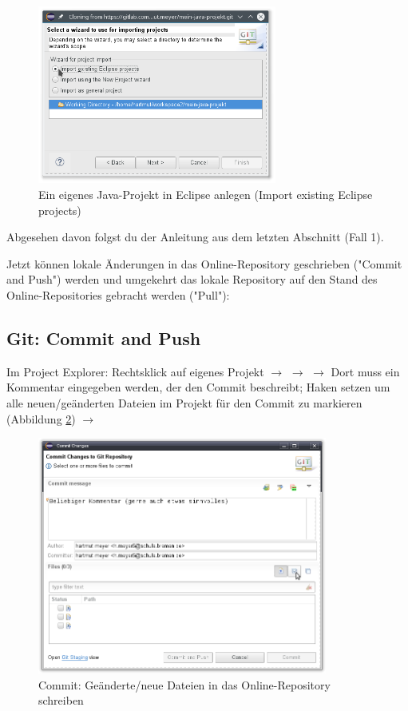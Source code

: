 \begin{figure}[h]
  \centering
   \includegraphics[width=0.70\textwidth]{./inf/SEKII/01_Vorbereitung/Import_Project_from_Git_Import_Existing_Eclipse_Project.png}
   \caption{Ein eigenes Java-Projekt in Eclipse anlegen (Import existing Eclipse projects)}
   \label{fig:import-project-from-git-import-existing-project}
\end{figure}

Abgesehen davon folgst du der Anleitung aus dem letzten Abschnitt (Fall 1).

Jetzt können lokale Änderungen in das Online-Repository geschrieben ("Commit
and Push") werden und umgekehrt das lokale Repository auf den Stand des
Online-Repositories gebracht werden ("Pull"):

\subsection{Git: Commit and Push}

Im Project Explorer: Rechtsklick auf eigenes Projekt $\rightarrow$ 
$\rightarrow$  $\rightarrow$ Dort muss ein Kommentar
eingegeben werden, der den Commit beschreibt; Haken setzen um alle
neuen/geänderten Dateien im Projekt für den Commit zu markieren (Abbildung
\ref{fig:git-commit}) $\rightarrow$ 

\begin{figure}[h]
  \centering
   \includegraphics[width=0.85\textwidth]{./inf/SEKII/01_Vorbereitung/Git-Commit.png}
   \caption{Commit: Geänderte/neue Dateien in das Online-Repository schreiben}
   \label{fig:git-commit}
\end{figure}

